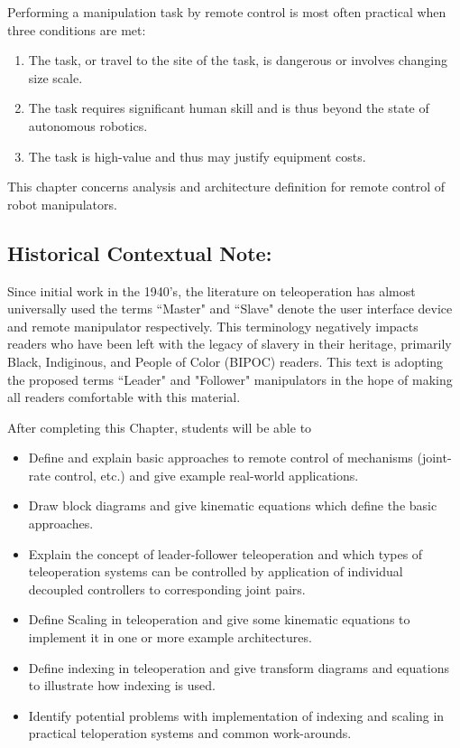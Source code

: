  Performing a manipulation task by remote 
control is most often practical when three conditions are met:
\begin{enumerate}
\item The task, or travel to the site of the task, is dangerous or involves
changing size scale. 
\item The task requires significant human skill and is thus beyond the state of 
autonomous robotics.
\item The task is high-value and thus may justify equipment costs.
\end{enumerate}
This chapter concerns analysis and architecture definition for 
remote control of robot manipulators.  


\subsection*{Historical Contextual Note:}
Since initial work in the 1940's, the literature on teleoperation has almost universally 
used the terms ``Master" and ``Slave" denote the user interface device and remote manipulator
respectively.   This terminology negatively impacts readers who have been left with 
the legacy of slavery in their heritage, primarily Black, Indiginous, and People of Color (BIPOC) 
readers.   This text is adopting the proposed terms ``Leader" and "Follower" manipulators 
in the hope of making all readers comfortable with this material. 




After completing this Chapter, students will be able to 
\begin{itemize}

\item 
Define and explain basic approaches to remote control 
of mechanisms (joint-rate control, etc.) and give example
real-world applications. 

\item 
Draw block diagrams and give kinematic equations which
define the basic approaches.

\item 
Explain the concept of leader-follower teleoperation and which types of teleoperation systems can be controlled by 
application of individual decoupled controllers to corresponding joint pairs. 

\item 
Define Scaling in teleoperation and give some kinematic 
equations to implement it in one or more example architectures.

\item 
Define indexing in teleoperation and give transform diagrams and equations to illustrate how indexing is used. 

\item 
Identify potential problems with implementation of indexing
and scaling in practical teloperation systems and common
work-arounds. 


\end{itemize}





